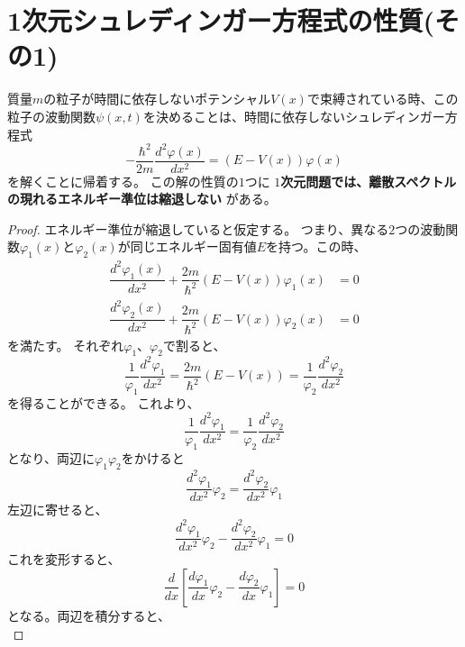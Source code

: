

\section{1次元シュレディンガー方程式の性質(その1)} \label{1dim_schrodinger_eq_propeties}
質量$m$の粒子が時間に依存しないポテンシャル$V(x)$で束縛されている時、この粒子の波動関数$\psi(x,t)$を決めることは、時間に依存しないシュレディンガー方程式
\begin{equation}
	- \dfrac{\hbar^2}{2m} \dfrac{d^2 \varphi(x)}{d x^2}= (E-V(x))\varphi(x)
\end{equation}
を解くことに帰着する。
この解の性質の$1$つに
{\bf $1$次元問題では、離散スペクトルの現れるエネルギー準位は縮退しない}
がある。

\begin{proof}
	エネルギー準位が縮退していると仮定する。
	つまり、異なる$2$つの波動関数$\varphi_1(x)$と$\varphi_2(x)$が同じエネルギー固有値$E$を持つ。この時、
	\begin{align}
		\dfrac{d^2 \varphi_1(x)}{dx^2} + \dfrac{2m}{\hbar^2}(E-V(x))\varphi_1(x) &= 0 \\
		\dfrac{d^2 \varphi_2(x)}{dx^2} + \dfrac{2m}{\hbar^2}(E-V(x))\varphi_2(x) &= 0
	\end{align}
	を満たす。
	それぞれ$\varphi_1$、$\varphi_2$で割ると、
	\begin{equation}
		\dfrac{1}{\varphi_1}\dfrac{d^2 \varphi_1}{dx^2} = \dfrac{2m}{\hbar^2}(E-V(x)) = \dfrac{1}{\varphi_2}\dfrac{d^2 \varphi_2}{dx^2}
	\end{equation}
	を得ることができる。
	これより、
	\begin{equation}
		\dfrac{1}{\varphi_1}\dfrac{d^2 \varphi_1}{dx^2} = \dfrac{1}{\varphi_2}\dfrac{d^2 \varphi_2}{dx^2}
	\end{equation}
	となり、両辺に$\varphi_1 \varphi_2$をかけると
	\begin{equation}
		\dfrac{d^2 \varphi_1}{dx^2}\varphi_2 = \dfrac{d^2 \varphi_2}{dx^2}\varphi_1
	\end{equation}
	左辺に寄せると、
	\begin{equation}
		\dfrac{d^2 \varphi_1}{dx^2}\varphi_2 - \dfrac{d^2 \varphi_2}{dx^2}\varphi_1 = 0
	\end{equation}
	これを変形すると、
	\begin{equation}
		\dfrac{d}{dx}\left[ \dfrac{d\varphi_1}{dx}\varphi_2 - \dfrac{d\varphi_2}{dx}\varphi_1\right] = 0
	\end{equation}
	となる。両辺を積分すると、
	\begin{equation}

\end{equation}
\end{proof}
